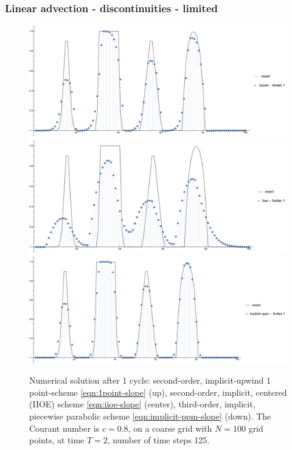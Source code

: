 \documentclass[../thesis.tex]{subfiles}
\begin{document}
\subsubsection{Linear advection - discontinuities - limited}
\begin{figure}[H]
	\centering
	\includegraphics[width=\textwidth]{fig-1point-c0p8-T2-limit1-shu.pdf}
	\includegraphics[width=\textwidth]{fig-iioe-c0p8-T2-limit1-shu.pdf}
	\includegraphics[width=\textwidth]{fig-implicit-ppm-c0p8-T2-limit1-shu.pdf}
	\caption{Numerical solution after 1 cycle: second-order, implicit-upwind 1 point-scheme \eqref{eqn:1point-slope} (up), second-order, implicit, centered (IIOE) scheme \eqref{eqn:iioe-slope} (center), third-order, implicit, piecewise parabolic scheme \eqref{eqn:implicit-ppm-slope} (down). The Courant number is \(c = 0.8\), on a coarse grid with \(N = 100\) grid points, at time \(T = 2\), number of time steps 125.}
	\label{fig:c0p8-T2-limit1-shu}
\end{figure}
\end{document}
